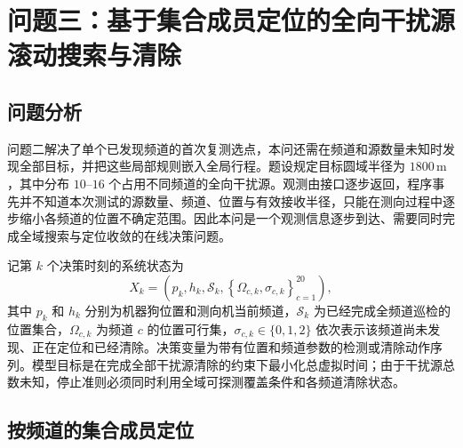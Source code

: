 \clearpage
\section{问题三：基于集合成员定位的全向干扰源滚动搜索与清除}

\subsection{问题分析}

问题二解决了单个已发现频道的首次复测选点，本问还需在频道和源数量未知时发现全部目标，并把这些局部规则嵌入全局行程。题设规定目标圆域半径为 $1800\,\mathrm m$，其中分布 $10$--$16$ 个占用不同频道的全向干扰源。观测由接口逐步返回，程序事先并不知道本次测试的源数量、频道、位置与有效接收半径，只能在测向过程中逐步缩小各频道的位置不确定范围。因此本问是一个观测信息逐步到达、需要同时完成全域搜索与定位收敛的在线决策问题。

记第 $k$ 个决策时刻的系统状态为
\begin{equation}
  X_k=\left(p_k,h_k,\mathcal S_k,
  \left\{\Omega_{c,k},\sigma_{c,k}\right\}_{c=1}^{20}\right),
  \label{eq:p3-state}
\end{equation}
其中 $p_k$ 和 $h_k$ 分别为机器狗位置和测向机当前频道，$\mathcal S_k$ 为已经完成全频道巡检的位置集合，$\Omega_{c,k}$ 为频道 $c$ 的位置可行集，$\sigma_{c,k}\in\{0,1,2\}$ 依次表示该频道尚未发现、正在定位和已经清除。决策变量为带有位置和频道参数的检测或清除动作序列。模型目标是在完成全部干扰源清除的约束下最小化总虚拟时间；由于干扰源总数未知，停止准则必须同时利用全域可探测覆盖条件和各频道清除状态。


\subsection{按频道的集合成员定位}

